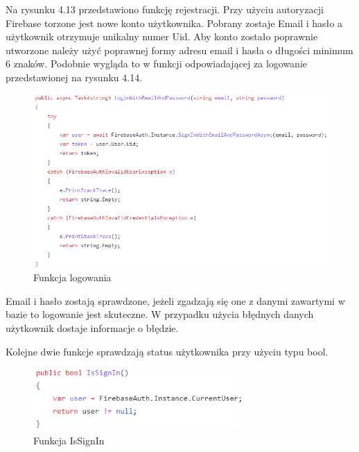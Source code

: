 Na rysunku 4.13 przedstawiono funkcję rejestracji. Przy użyciu autoryzacji Firebase torzone jest nowe konto użytkownika. Pobrany zostaje Email i hasło a użytkownik otrzymuje unikalny numer Uid. Aby konto zostało poprawnie utworzone należy użyć poprawnej formy adresu email i hasła o długości minimum 6 znaków. \newline 
Podobnie wygląda to w funkcji odpowiadającej za logowanie przedstawionej na rysunku 4.14. 

\begin{figure}[!htb]
	\begin{center}
		\includegraphics[width=15cm]{rys/authdroid2.png}
		\caption{Funkcja logowania}
		\label{rys:rysunek025}
	\end{center}
\end{figure}

Email i hasło zostają sprawdzone, jeżeli zgadzają się one z danymi zawartymi w bazie to logowanie jest skuteczne. W przypadku użycia błędnych danych użytkownik dostaje informacje o błędzie. \newline \newline

Kolejne dwie funkcje sprawdzają status użytkownika przy użyciu typu bool.

\begin{figure}[!htb]
	\begin{center}
		\includegraphics[width=8cm]{rys/authdroid3.png}
		\caption{Funkcja IsSignIn}
		\label{rys:rysunek026}
	\end{center}
\end{figure}  

